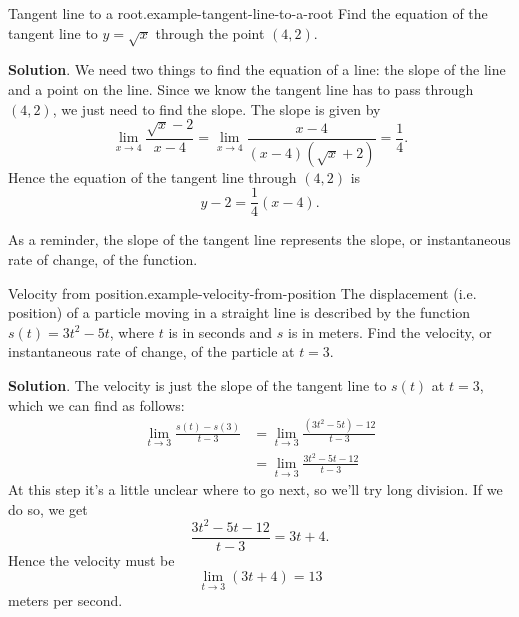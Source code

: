 \documentclass[10pt,]{book}
\numberwithin{equation}{section}
\begin{document}
\begin{example}{Tangent line to a root.}{example-tangent-line-to-a-root}%
\hypertarget{p-80}{}%
Find the equation of the tangent line to \(y=\sqrt{x}\) through the point \((4,2)\).%
\par\smallskip%
\noindent\textbf{Solution}.\hypertarget{solution-17}{}\quad%
\hypertarget{p-81}{}%
We need two things to find the equation of a line: the slope of the line and a point on the line. Since we know the tangent line has to pass through \((4,2)\), we just need to find the slope. The slope is given by%
\begin{equation*}
\lim_{x\to 4}\frac{\sqrt{x}-2}{x-4} = \lim_{x\to4}\frac{x-4}{(x-4)(\sqrt{x}+2)} = \frac{1}{4}.
\end{equation*}
Hence the equation of the tangent line through \((4,2)\) is%
\begin{equation*}
y-2 = \frac{1}{4}(x-4).
\end{equation*}
%
\end{example}
\hypertarget{p-82}{}%
As a reminder, the slope of the tangent line represents the slope, or instantaneous rate of change, of the function.%
\begin{example}{Velocity from position.}{example-velocity-from-position}%
\hypertarget{p-83}{}%
The displacement (i.e. position) of a particle moving in a straight line is described by the function \(s(t) = 3t^{2} - 5t\), where \(t\) is in seconds and \(s\) is in meters. Find the velocity, or instantaneous rate of change, of the particle at \(t=3\).%
\par\smallskip%
\noindent\textbf{Solution}.\hypertarget{solution-18}{}\quad%
\hypertarget{p-84}{}%
The velocity is just the slope of the tangent line to \(s(t)\) at \(t=3\), which we can find as follows:%
%
\begin{align*}
\lim_{t\to3}\frac{s(t) - s(3)}{t-3} & = \lim_{t\to3}\frac{(3t^{2} - 5t) - 12}{t-3} \\
& = \lim_{t\to3}\frac{3t^{2} - 5t - 12}{t-3} 
\end{align*}
\hypertarget{p-85}{}%
At this step it's a little unclear where to go next, so we'll try long division. If we do so, we get%
\begin{equation*}
\frac{3t^{2} - 5t - 12}{t-3} = 3t+4.
\end{equation*}
Hence the velocity must be%
\begin{equation*}
\lim_{t\to3}(3t+4) = 13
\end{equation*}
meters per second.%
\end{example}
\end{document}
